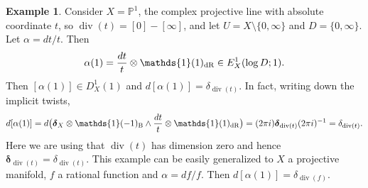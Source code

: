 \documentclass[11pt,a4paper]{amsart}
\newcommand{\Betti}{\text{\rm B}}
\newcommand{\dR}{\text{\rm dR}}
\renewcommand{\P}{\mathds{P}}
\newcommand{\bfone}{{\mathds{1}}}
\newcommand{\bfdelta}{{\boldsymbol{\delta}}}
\DeclareMathOperator {\Div}{div}
\numberwithin{equation}{section}
\theoremstyle{plain}
\theoremstyle{definition}
\newtheorem{ex}[prop]{Example}
\begin{document}
\begin{ex}\label{exm:5} Consider $X=\P^{1}$, the complex projective line with absolute
  coordinate $t$, so $\Div(t)=[0]-[\infty]$, and let
  $U=X\setminus \{0,\infty \}$ and $D=\{0,\infty \}$. Let $\alpha
  =dt/t$. Then 
  \begin{displaymath}
    \alpha(1) = \frac{dt}{t}\otimes \bfone(1)_{\dR}\in E^{1}_{X}(\log D; 1).
  \end{displaymath}
  Then $[\alpha(1)]\in D^{1}_{X}(1)$ and $d[\alpha(1) ]=\delta
  _{\Div(t)}$. In fact, writing down the implicit twists,
  \begin{displaymath}
    d[\alpha(1)]=d\big (\bfdelta_X\otimes
    \bfone(-1)_{\Betti}\wedge \frac{dt}{t}\otimes \bfone(1)_{\dR}\big)=(2\pi i)\bfdelta_{\Div(t)}
    (2\pi i)^{-1}=\delta _{\Div(t)}. 
  \end{displaymath}
  Here we are using that $\Div(t)$ has dimension zero and hence
  $\bfdelta_{\Div(t)}=\delta _{\Div(t)}$.
  This example can be easily generalized to $X$ a projective manifold,
  $f$ a rational function and 
  $\alpha =df/f$. Then $d[\alpha (1)]=\delta _{\Div(f)}$. 
\end{ex}
\end{document}
